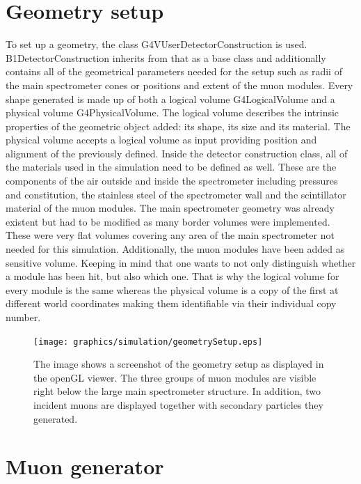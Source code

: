   \section{Geometry setup}
  \label{ch:Simulation software:sec:Geometry setup}
  To set up a geometry, the class G4VUserDetectorConstruction is used. B1DetectorConstruction inherits from that as a base class and additionally contains all of the geometrical parameters needed for the setup such as radii of the main spectrometer cones or positions and extent of the muon modules. Every shape generated is made up of both a logical volume G4LogicalVolume and a physical volume G4PhysicalVolume. The logical volume describes the intrinsic properties of the geometric object added: its shape, its size and its material. The physical volume accepts a logical volume as input providing position and alignment of the previously defined.
  Inside the detector construction class, all of the materials used in the simulation need to be defined as well. These are the components of the air outside and inside the spectrometer including pressures and constitution, the stainless steel of the spectrometer wall and the scintillator material of the muon modules.
  The main spectrometer geometry was already  existent but had to be modified as many border volumes were implemented. These were very flat volumes covering any area of the main spectrometer not needed for this simulation. Additionally, the muon modules have been added as sensitive volume. Keeping in mind that one wants to not only distinguish whether a module has been hit, but also which one. That is why the logical volume for every module is the same whereas the physical volume is a copy of the first at different world coordinates making them identifiable via their individual copy number.
  
  \begin{figure}
  	\centering
  	\texttt{[image: graphics/simulation/geometrySetup.eps]}
  	\caption[Simulation geometry setup]{The image shows a screenshot of the geometry setup as displayed in the openGL viewer. The three groups of muon modules are visible right below the large main spectrometer structure. In addition, two incident muons are displayed together with secondary particles they generated.}
  \end{figure}

  
  \section{Muon generator}
  \label{ch:Simulation software:sec:Muon generator}
  
